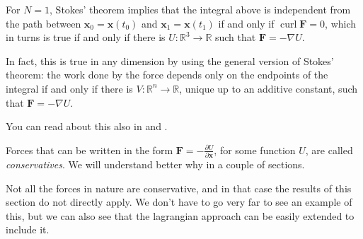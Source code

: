 \documentclass[english,fontsize=11pt,paper=a5,oneside]{scrbook}
\newcommand{\R}{\mathbb{R}}
\newcommand{\bx}{\bm{x}}
\DeclareMathOperator{\curl}{curl}
\theoremstyle{definition}
\newenvironment{remark}
  {\pushQED{\qed}\renewcommand{\qedsymbol}{$\lozenge$}\remarkx}
  {\popQED\endremarkx}
\begin{document}
\begin{remark}
For $N=1$, Stokes' theorem implies that the integral above is independent from the path between $\bx_0 = \bx(t_0)$ and $\bx_1 = \bx(t_1)$ if and only if $\curl \bm{F} = 0$, which in turns is true if and only if there is $U:\R^3\to\R$ such that $\bm{F} = -\nabla U$.

In fact, this is true in any dimension by using the general version of Stokes' theorem: the work done by the force depends only on the endpoints of the integral if and only if there is $V:\R^n\to\R$, unique up to an additive constant, such that $\bm{F} = -\nabla U$.

You can read about this also in \cite[Chapter 2.5]{book:arnold} and \cite[Theorem 6.3 and 8.1]{book:knauf}.
\end{remark}

Forces that can be written in the form $\bm{F} = -\frac{\partial U}{\partial \bm{x}}$, for some function $U$, are called \emph{conservatives}. We will understand better why in a couple of sections.

Not all the forces in nature are conservative, and in that case the results of this section do not directly apply.
We don't have to go very far to see an example of this, but we can also see that the lagrangian approach can be easily extended to include it.
\end{document}
